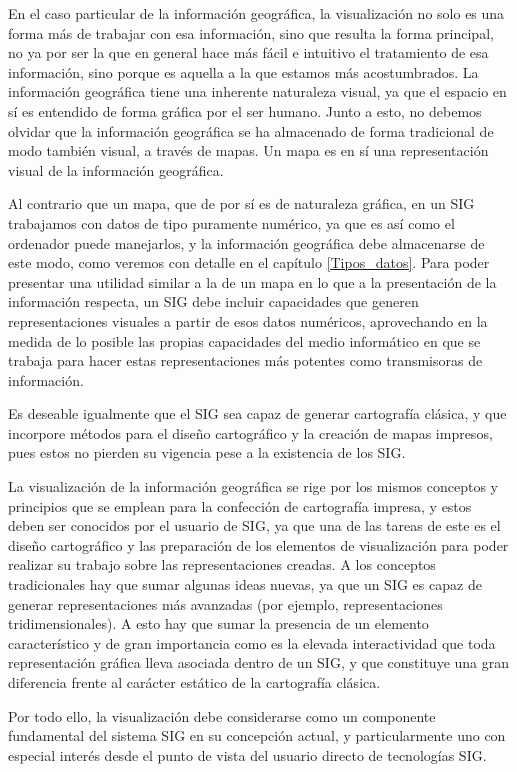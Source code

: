 En el caso particular de la información geográfica, la visualización no solo es una forma más de trabajar con esa información, sino que resulta la forma principal, no ya por ser la que en general hace más fácil e intuitivo el tratamiento de esa información, sino porque es aquella a la que estamos más acostumbrados. La información geográfica tiene una inherente naturaleza visual, ya que el espacio en sí es entendido de forma gráfica por el ser humano. Junto a esto, no debemos olvidar que la información geográfica se ha almacenado de forma tradicional de modo también visual, a través de mapas. Un mapa es en sí una representación visual de la información geográfica.

Al contrario que un mapa, que de por sí es de naturaleza gráfica, en un SIG trabajamos con datos de tipo puramente numérico, ya que es así como el ordenador puede manejarlos, y la información geográfica debe almacenarse de este modo, como veremos con detalle en el capítulo \ref{Tipos_datos}. Para poder presentar una utilidad similar a la de un mapa en lo que a la presentación de la información respecta, un SIG debe incluir capacidades que generen representaciones visuales a partir de esos datos numéricos, aprovechando en la medida de lo posible las propias capacidades del medio informático en que se trabaja para hacer estas representaciones más potentes como transmisoras de información. 

Es deseable igualmente que el SIG sea capaz de generar cartografía clásica, y que incorpore métodos para el diseño cartográfico y la creación de mapas impresos, pues estos no pierden su vigencia pese a la existencia de los SIG.

La visualización de la información geográfica se rige por los mismos conceptos y principios que se emplean para la confección de cartografía impresa, y estos deben ser conocidos por el usuario de SIG, ya que una de las tareas de este es el diseño cartográfico y las preparación de los elementos de visualización para poder realizar su trabajo sobre las representaciones creadas. A los conceptos tradicionales hay que sumar algunas ideas nuevas, ya que un SIG es capaz de generar representaciones más avanzadas (por ejemplo, representaciones tridimensionales). A esto hay que sumar la presencia de un elemento característico y de gran importancia como es la elevada interactividad que toda representación gráfica lleva asociada dentro de un SIG, y que constituye una gran diferencia frente al carácter estático de la cartografía clásica.

Por todo ello, la visualización debe considerarse como un componente fundamental del sistema SIG en su concepción actual, y particularmente uno con especial interés desde el punto de vista del usuario directo de tecnologías SIG.

